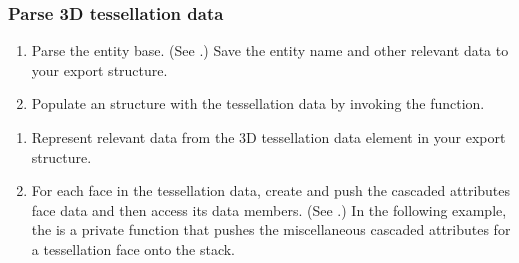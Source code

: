 \documentclass[letterpaper,12pt,english,openany,oneside]{sphinxmanual}
\begin{document}
\subsubsection{Parse 3D tessellation data}
\label{\detokenize{Plugins_A3D_API:parse-3d-tessellation-data}}\begin{enumerate}
%
\item {} 
Parse the entity base. (See .) Save the entity name and other relevant data to your export structure.

\item {} 
Populate an  structure with the tessellation data by invoking the  function.

\end{enumerate}

\begin{sphinxVerbatim}[commandchars=\\\{\}]
 
    
\end{sphinxVerbatim}
\begin{enumerate}
%
\setcounter{enumi}{2}
\item {} 
Represent relevant data from the 3D tessellation data element in your export structure.

\item {} 
For each face in the tessellation data, create and push the cascaded attributes face data and then access its data members. (See .) In the following example, the  is a private function that pushes the miscellaneous cascaded attributes for a tessellation face onto the stack.

\end{enumerate}
\end{document}
